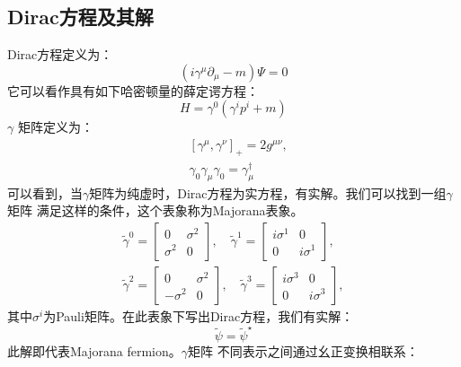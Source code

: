 \documentclass[12pt, a4paper, oneside]{ctexbook}
\def\gm{$ \gamma $矩阵 }
\begin{document}
	\subsection{Dirac方程及其解}
	Dirac方程定义为：
	\begin{equation}
		\left(i \gamma^\mu \partial_\mu-m\right) \Psi=0\label{de}
	\end{equation}
	它可以看作具有如下哈密顿量的薛定谔方程：
	\begin{equation}
		H=\gamma^0\left(\gamma^i p^i+m\right)
	\end{equation}
	$\gamma$ 矩阵定义为：
	\begin{equation}
		\begin{aligned}
			& {\left[\gamma^\mu, \gamma^\nu\right]_{+}=2 g^{\mu \nu},} \\
			& \gamma_0 \gamma_\mu \gamma_0=\gamma_\mu^{\dagger}
			\end{aligned}
	\end{equation}
	可以看到，当$ \gamma $矩阵为纯虚时，Dirac方程为实方程，有实解。我们可以找到一组\gm 满足这样的条件，这个表象称为Majorana表象。
	\begin{equation}
		\begin{array}{ll}
			\widetilde{\gamma}^0=\left[\begin{array}{cc}
			0 & \sigma^2 \\
			\sigma^2 & 0
			\end{array}\right], \quad \widetilde{\gamma}^1=\left[\begin{array}{cc}
			i \sigma^1 & 0 \\
			0 & i \sigma^1
			\end{array}\right], \\
			\tilde{\gamma}^2=\left[\begin{array}{cc}
			0 & \sigma^2 \\
			-\sigma^2 & 0
			\end{array}\right], \quad \tilde{\gamma}^3=\left[\begin{array}{cc}
			i \sigma^3 & 0 \\
			0 & i \sigma^3
			\end{array}\right],
			\end{array}
	\end{equation}
	其中$ \sigma^i $为Pauli矩阵。在此表象下写出Dirac方程，我们有实解：
	\begin{equation}
		\widetilde{\psi}=\tilde{\psi}^{\star}\label{rc}
	\end{equation} 
	此解即代表Majorana fermion。\gm 不同表示之间通过幺正变换相联系：
\end{document}
